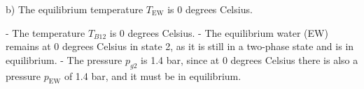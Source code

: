 b) The equilibrium temperature \( T_{\text{EW}} \) is 0 degrees Celsius.

- The temperature \( T_{B12} \) is 0 degrees Celsius.
- The equilibrium water (EW) remains at 0 degrees Celsius in state 2, as it is still in a two-phase state and is in equilibrium.
- The pressure \( p_{g2} \) is 1.4 bar, since at 0 degrees Celsius there is also a pressure \( p_{\text{EW}} \) of 1.4 bar, and it must be in equilibrium.